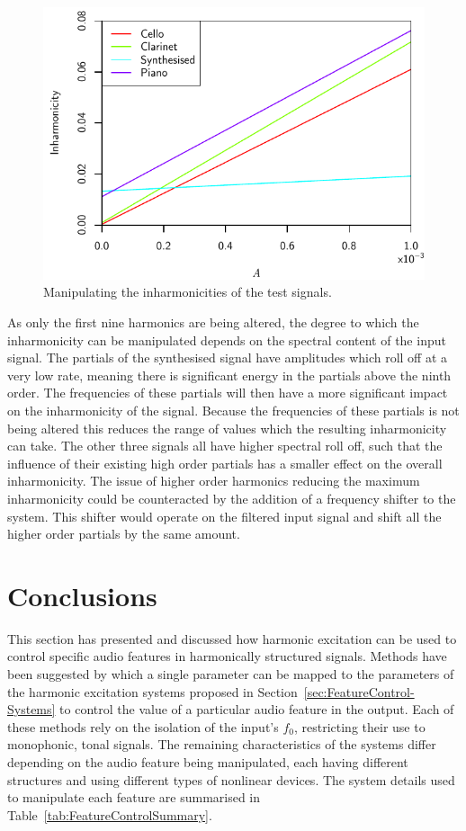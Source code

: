 		\begin{figure}[h!]
			\centering
			\includegraphics{chapter6/Images/MoveInharmonicities.pdf}
			\caption{Manipulating the inharmonicities of the test signals.}
			\label{fig:MoveInharmonicities}
		\end{figure}

		As only the first nine harmonics are being altered, the degree to which the inharmonicity can be
		manipulated depends on the spectral content of the input signal. The partials of the synthesised signal
		have amplitudes which roll off at a very low rate, meaning there is significant energy in the partials
		above the ninth order. The frequencies of these partials will then have a more significant impact on the
		inharmonicity of the signal. Because the frequencies of these partials is not being altered this reduces
		the range of values which the resulting inharmonicity can take. The other three signals all have higher
		spectral roll off, such that the influence of their existing high order partials has a smaller effect on
		the overall inharmonicity. The issue of higher order harmonics reducing the maximum inharmonicity could be
		counteracted by the addition of a frequency shifter to the system. This shifter would operate on the
		filtered input signal and shift all the higher order partials by the same amount.

\section{Conclusions}
\label{sec:FeatureControl-Conclusions}
	This section has presented and discussed how harmonic excitation can be used to control specific audio features in
	harmonically structured signals. Methods have been suggested by which a single parameter can be mapped to the
	parameters of the harmonic excitation systems proposed in Section~\ref{sec:FeatureControl-Systems} to control the
	value of a particular audio feature in the output. Each of these methods rely on the isolation of the
	input's $f_{0}$, restricting their use to monophonic, tonal signals. The remaining characteristics of the systems
	differ depending on the audio feature being manipulated, each having different structures and using different types
	of nonlinear devices. The system details used to manipulate each feature are summarised in
	Table~\ref{tab:FeatureControlSummary}.


